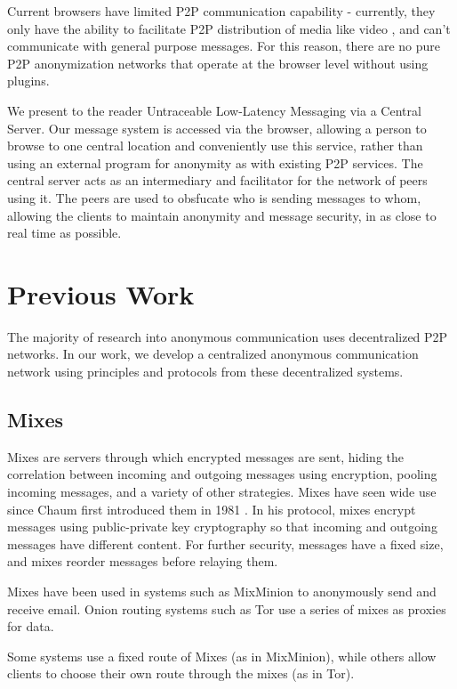 \documentclass[twocolumn,11pt,english]{article}
\begin{document}
Current browsers have limited P2P communication capability - currently, they only have the ability to facilitate P2P distribution of media like video \cite{daoust2012towards}, and can't communicate with general purpose messages. For this reason, there are no pure P2P anonymization networks that operate at the browser level without using plugins. 

We present to the reader Untraceable Low-Latency Messaging via a Central Server. Our message system is accessed via the browser, allowing a person to browse to one central location and conveniently use this service, rather than using an external program for anonymity as with existing P2P services. The central server acts as an intermediary and facilitator for the network of peers using it. The peers are used to obsfucate who is sending messages to whom, allowing the clients to maintain anonymity and message security, in as close to real time as possible.

\section{Previous Work}
The majority of research into anonymous communication uses decentralized P2P networks. In our work, we develop a centralized anonymous communication network using principles and protocols from these decentralized systems. 

\subsection{Mixes}
Mixes are servers through which encrypted messages are sent, hiding the correlation between incoming and outgoing messages using encryption, pooling incoming messages, and a variety of other strategies\cite{chaum-mix}. Mixes have seen wide use since Chaum first introduced them in 1981 \cite{chaum-mix}. In his protocol, mixes encrypt messages using public-private key cryptography so that incoming and outgoing messages have different content. For further security, messages have a fixed size, and mixes reorder messages before relaying them. 

 Mixes have been used in systems such as MixMinion\cite{minion-design} to anonymously send and receive email. Onion routing systems such as Tor \cite{tor-design} use a series of mixes as proxies for data. 

Some systems use a fixed route of Mixes (as in MixMinion), while others allow clients to choose their own route through the mixes (as in Tor).
\end{document}
